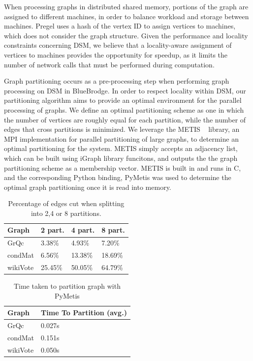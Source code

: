 When processing graphs in distributed shared memory, portions of the graph are
assigned to different machines, in order to balance workload and storage between
machines. Pregel uses a hash of the vertex ID to assign vertices to machines,
~\cite{Malewicz:2010:PSL:1807167.1807184} which does not consider the graph
structure. Given the performance and locality constraints concerning DSM,
we believe that a locality-aware assignment of vertices to machines provides the
opportunity for speedup, as it limits the number of network calls that must
be performed during computation.

Graph partitioning occurs as a pre-processing step when performing
graph processing on DSM in BlueBrodge. In order to respect locality within 
DSM, our partitioning algorithm aims to provide an optimal environment for the
parallel processing of graphs. We define an optimal partitioning scheme as one
in which the number of vertices are roughly equal for each partition, while the
number of edges that cross partitions is minimized. We leverage the METIS
~\cite{Lasalle:2013:metis} library, an MPI implementation for parallel
partitioning of large graphs, to determine an optimal partitioning for the
system. METIS simply accepts an adjacency list, which can be built using iGraph
library funcitons, and outputs the the graph partitioning scheme as a membership
vector. METIS is built in and runs in C, and the corresponding Python binding,
PyMetis \cite{pymetis} was used to determine the optimal graph partitioning once
it is read into memory. 

\begin{table}[h]
\begin{tabularx}{\linewidth}{|X|X|X|X|}
\hline
Graph & 2 part. & 4 part. & 8 part. \\ \hline \hline
GrQc & 3.38\% & 4.93\% & 7.20\% \\ \hline
condMat & 6.56\% & 13.38\% & 18.69\% \\ \hline
wikiVote & 25.45\% & 50.05\% & 64.79\% \\ \hline
\end{tabularx}
\caption{Percentage of edges cut when splitting into 2,4 or 8 partitions.}
\label{tab:cutting}
\end{table}

\begin{table}[h]
\begin{tabularx}{\linewidth}{|X|X|}
\hline
Graph & Time To Partition (avg.) \\ \hline \hline
GrQc & 0.027s \\ \hline
condMat & 0.151s \\ \hline
wikiVote & 0.050s \\ \hline
\end{tabularx}
\caption{Time taken to partition graph with PyMetis}
\label{tab:part_time}
\end{table}

